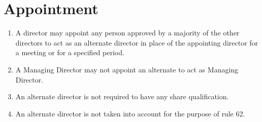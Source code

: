 \section{Appointment}

\begin{enumerate}[label=(\alph*)]
    \item A director may appoint any person approved by a majority of the other directors to act as an alternate director in place of the appointing director for a meeting or for a specified period.
    
    \item A Managing Director may not appoint an alternate to act as Managing Director.
    
    \item An alternate director is not required to have any share qualification.
    
    \item An alternate director is not taken into account for the purpose of rule 62.
\end{enumerate} 